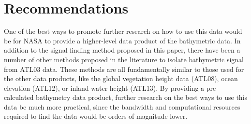 \section{Recommendations}
One of the best ways to promote further research on how to use this data would be for NASA to provide a higher-level data product of the bathymetric data. In addition to the signal finding method proposed in this paper, there have been a number of other methods proposed in the literature to isolate bathymetric signal from ATL03 data. These methods are all fundamentally similar to those used for the other data products, like the global vegetation height data (ATL08), ocean elevation (ATL12), or inland water height (ATL13). By providing a pre-calculated bathymetry data product, further research on the best ways to use this data be much more practical, since the bandwidth and computational resources required to find the data would be orders of magnitude lower.

